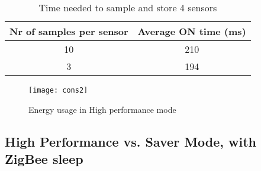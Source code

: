 \begin{table}[!ht]
\begin{center}
\begin{tabular}[!ht]{|c|c|}
\hline
\textbf{Nr of samples per sensor} & \textbf{Average ON time (ms)}\\
\hline
10 & 210\\
\hline
3 & 194\\
\hline
\end{tabular}
\caption{Time needed to sample and store 4 sensors}
\label{tab:sendTime3}
\end{center}
\end{table}
\pagebreak
\begin{figure}[htbp]
\centering
\texttt{[image: cons2]}
\caption{Energy usage in High performance mode}
\label{fig:consump2}
\end{figure}
\clearpage
\pagebreak
\subsection{High Performance vs. Saver Mode, with ZigBee sleep}